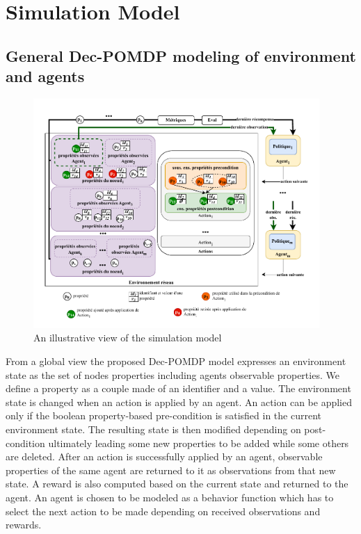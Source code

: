 \section{Simulation Model}

\subsection{General Dec-POMDP modeling of environment and agents}


\begin{figure}[]
    \centering
    \includegraphics[width=0.97\textwidth]{figures/model_example_illustration.pdf}
    \caption{An illustrative view of the simulation model}
    \label{fig:model_example_illustration}
\end{figure}

\noindent
From a global view the proposed Dec-POMDP model expresses an environment state as the set of nodes properties including agents observable properties. We define a property as a couple made of an identifier and a value. The environment state is changed when an action is applied by an agent. An action can be applied only if the boolean property-based pre-condition is satisfied in the current environment state. The resulting state is then modified depending on post-condition ultimately leading some new properties to be added while some others are deleted. After an action is successfully applied by an agent, observable properties of the same agent are returned to it as observations from that new state. A reward is also computed based on the current state and returned to the agent. An agent is chosen to be modeled as a behavior function which has to select the next action to be made depending on received observations and rewards.

